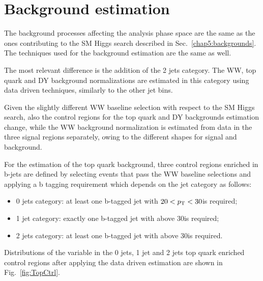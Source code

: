 \section{Background estimation}\label{chap6:Backgrounds}

The background processes affecting the analysis phase space are the same as the ones contributing to the SM Higgs search described in Sec.~\ref{chap5:backgrounds}. The techniques used for the background estimation are the same as well.

The most relevant difference is the addition of the 2 jets category. The WW, top quark and DY background normalizations are estimated in this category using data driven techniques, similarly to the other jet bins.

Given the slightly different WW baseline selection with respect to the SM Higgs search, also the control regions for the top quark and DY backgrounds estimation change, while the WW background normalization is estimated from data in the three signal regions separately, owing to the different \mti shapes for signal and background.

For the estimation of the top quark background, three control regions enriched in b-jets are defined by selecting events that pass the WW baseline selections and applying a b tagging requirement which depends on the jet category as follows:
\begin{itemize}
\item 0 jets category: at least one b-tagged jet with $20 < p_\mathrm{T} < 30$\GeV is required;
\item 1 jet category: exactly one b-tagged jet with \pt above 30\GeV is required;
\item 2 jets category: at least one b-tagged jet with \pt above 30\GeV is required.
\end{itemize}
Distributions of the \mti variable in the 0 jets, 1 jet and 2 jets top quark enriched control regions after applying the data driven estimation are shown in Fig.~\ref{fig:TopCtrl}.

